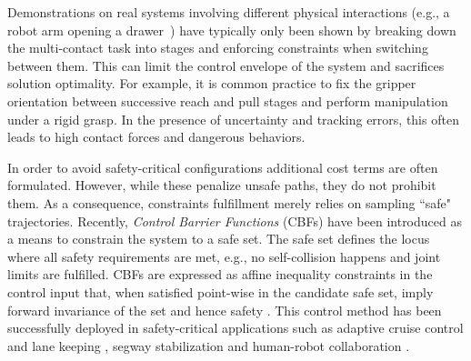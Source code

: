 Demonstrations on real systems involving different physical interactions (e.g., a robot arm opening a drawer~\cite{abraham_model-based_2020}) have typically only been shown by breaking down the multi-contact task into stages and enforcing constraints when switching between them. 
This can limit the control envelope of the system and sacrifices solution optimality. For example, it is common practice to fix the gripper orientation between successive reach and pull stages and perform manipulation under a rigid grasp. In the presence of uncertainty and tracking errors, this often leads to high contact forces and dangerous behaviors.


In order to avoid safety-critical configurations additional cost terms are often formulated. However, while these penalize unsafe paths, they do not prohibit them. As a consequence, constraints fulfillment merely relies on sampling ``safe" trajectories. 
Recently, \emph{Control Barrier Functions} (CBFs) have been introduced as a means to constrain the system to a safe set. The safe set defines the locus where all safety requirements are met, e.g., no self-collision happens and joint limits are fulfilled. CBFs are expressed as affine inequality constraints in the control input that, when satisfied point-wise in the candidate safe set, imply forward invariance of the set and hence safety \cite{ames2016control}.  This control method has been successfully deployed in safety-critical applications such as adaptive cruise control and lane keeping \cite{vahidi2003research}, segway stabilization \cite{gurriet2018towards} and human-robot collaboration \cite{benzi2021optimization}.

